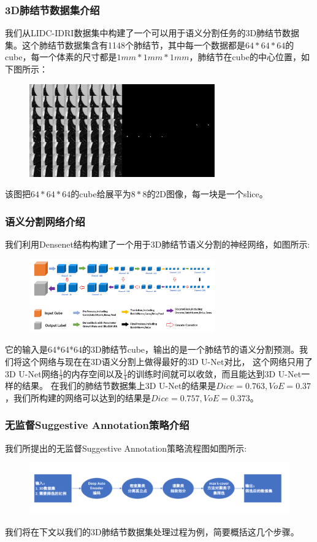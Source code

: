 \documentclass[9pt]{beamer}
\begin{document}
\begin{frame}[fragile]
	\frametitle{3D肺结节数据集介绍}
	我们从LIDC-IDRI数据集中构建了一个可以用于语义分割任务的3D肺结节数据集。这个肺结节数据集含有1148个肺结节，其中每一个数据都是$64*64*64$的cube，每一个体素的尺寸都是$1mm*1mm*1mm$，肺结节在cube的中心位置，如下图所示：
		\begin{figure}[H]%
			\centering
			\includegraphics[width=8cm]{dataset.png}%
		\end{figure}
	该图把$64*64*64$的cube给展平为$8*8$的2D图像，每一块是一个slice。
\end{frame}

\begin{frame}[fragile]
	\frametitle{语义分割网络介绍}
	我们利用Densenet结构构建了一个用于3D肺结节语义分割的神经网络，如图所示:
		\begin{figure}[H]%
			\centering
			\includegraphics[width=8cm]{DenseSegnet.png}%
		\end{figure}
	它的输入是64*64*64的3D肺结节cube，输出的是一个肺结节的语义分割预测。我们将这个网络与现在在3D语义分割上做得最好的3D U-Net对比，
	这个网络只用了3D U-Net网络$\frac{1}{3}$的内存空间以及$\frac{1}{4}$的训练时间就可以收敛，而且能达到3D U-Net一样的结果。
	在我们的肺结节数据集上3D U-Net的结果是$Dice=0.763,VoE=0.37$，我们所构建的网络可以达到的结果是$Dice=0.757,VoE=0.373$。

\end{frame}

\begin{frame}[fragile]
	\frametitle{无监督Suggestive Annotation策略介绍}
	我们所提出的无监督Suggestive Annotation策略流程图如图所示:
	\begin{figure}[H]%
		\centering
		\includegraphics[width=12cm]{suggest_flow_chart.png}%
	\end{figure}
	我们将在下文以我们的3D肺结节数据集处理过程为例，简要概括这几个步骤。
	
\end{frame}
\end{document}
